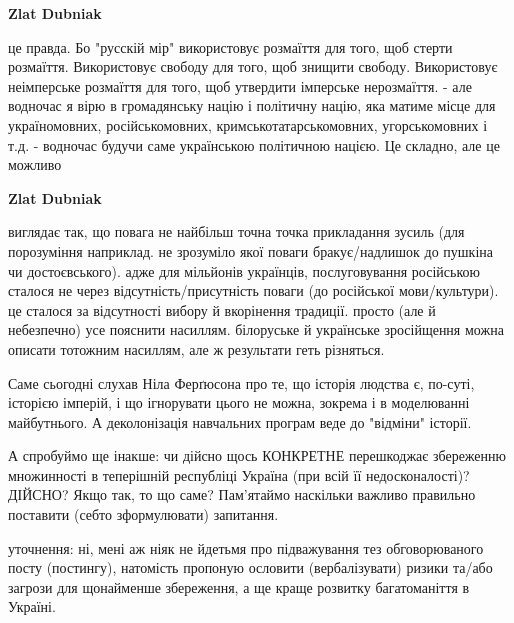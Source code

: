 \begin{itemize}
\begin{itemize} %
\textbf{Zlat Dubniak} 

це правда. Бо "русскій мір" використовує розмаїття для того, щоб стерти
розмаїття. Використовує свободу для того, щоб знищити свободу. Використовує
неімперське розмаїття для того, щоб утвердити імперське нерозмаїття. - але
водночас я вірю в громадянську націю і політичну націю, яка матиме місце для
україномовних, російськомовних, кримськотатарськомовних, угорськомовних і т.д.
- водночас будучи саме українською політичною нацією. Це складно, але це
можливо

\textbf{Zlat Dubniak} 

виглядає так, що повага не найбільш точна точка прикладання зусиль (для
порозуміння наприклад. не зрозуміло якої поваги бракує/надлишок до пушкіна чи
достоєвського). адже для мільйонів українців, послуговування російською сталося
не через відсутність/присутність поваги (до російської мови/культури). це
сталося за відсутності вибору й вкорінення традиції. просто (але й небезпечно)
усе пояснити насиллям. білоруське й українське зросійщення можна описати
тотожним насиллям, але ж результати геть різняться.

\end{itemize} %


Саме сьогодні слухав Ніла Ферґюсона про те, що історія людства є, по-суті,
історією імперій, і що ігнорувати цього не можна, зокрема і в моделюванні
майбутнього. А деколонізація навчальних програм веде до "відміни" історії.

А спробуймо ще інакше:
чи дійсно щось КОНКРЕТНЕ перешкоджає збереженню множинності в теперішній республіці Україна (при всій її недосконалості)?
ДІЙСНО?
Якщо так, то що саме?
Пам'ятаймо наскільки важливо правильно поставити (себто зформулювати) запитання.

\begin{itemize} %
уточнення:
ні, мені аж ніяк не йдетьмя про підважування тез обговорюваного посту (постингу), натомість пропоную ословити (вербалізувати) ризики та/або загрози для щонайменше збереження, а ще краще розвитку багатоманіття в Україні.
\end{itemize} %

\end{itemize} %
